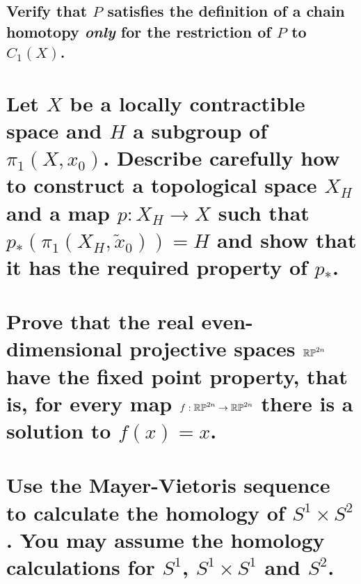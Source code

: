 \documentclass[10pt]{article}
\begin{document}
\subsection{Verify that $P$ satisfies the definition of a chain homotopy \emph{only} for the
  restriction of $P$ to $C_1(X)$.}

\section{Let $X$ be a locally contractible space and $H$ a subgroup of $\pi_1(X,x_0)$. Describe
  carefully how to construct a topological space $X_H$ and a map $p:X_H \to X$ such that
  $p_*(\pi_1(X_H,\tilde{x}_0))=H$ and show that it has the required property of
  $p_*$. }

\section{Prove that the real even-dimensional projective spaces $\mathbb{RP}^{2n}$ have the fixed
  point property, that is, for every map $f: \mathbb{RP}^{2n} \to \mathbb{RP}^{2n}$ there is a
  solution to $f(x) =x$. }

\section{Use the Mayer-Vietoris sequence to calculate the homology of $S^1 \times S^2$. You may
  assume the homology calculations for $S^1$, $S^1 \times S^1$ and $S^2$.}
\end{document}
